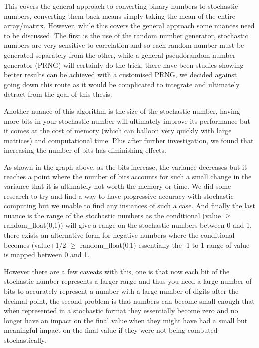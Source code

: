 \documentclass[a4paper,oneside,phd,etd]{BYUPhys}
\begin{document}
This covers the general approach to converting binary numbers to stochastic numbers, converting them back means simply taking the mean of the entire array/matrix. However, while this covers the general approach some nuances need to be discussed. The first is the use of the random number generator, stochastic numbers are very sensitive to correlation\cite{8342234} and so each random number must be generated separately from the other, while a general pseudorandom number generator (PRNG) will certainly do the trick, there have been studies showing better results can be achieved with a customised PRNG\cite{lee2019synthesizing}, we decided against going down this route as it would be complicated to integrate and ultimately detract from the goal of this thesis.

Another nuance of this algorithm is the size of the stochastic number, having more bits in your stochastic number will ultimately improve its performance but it comes at the cost of memory (which can balloon very quickly with large matrices) and computational time. Plus after further investigation, we found that increasing the number of bits has diminishing effects.

As shown in the graph above, as the bits increase, the variance decreases but it reaches a point where the number of bits accounts for such a small change in the variance that it is ultimately not worth the memory or time. We did some research to try and find a way to have progressive accuracy with stochastic computing but we unable to find any instances of such a case. And finally the last nuance is the range of the stochastic numbers as the conditional (value $\geq$ random\_float(0,1)) will give a range on the stochastic numbers between 0 and 1, there exists an alternative form for negative numbers where the conditional becomes (value+1/2 $\geq$ random\_float(0,1) essentially the -1 to 1 range of value is mapped between 0 and 1. 

However there are a few caveats with this, one is that now each bit of the stochastic number represents a larger range and thus you need a large number of bits to accurately represent a number with a large number of digits after the decimal point, the second problem is that numbers can become small enough that when represented in a stochastic format they essentially become zero and no longer have an impact on the final value when they might have had a small but meaningful impact on the final value if they were not being computed stochastically. 
\end{document}
